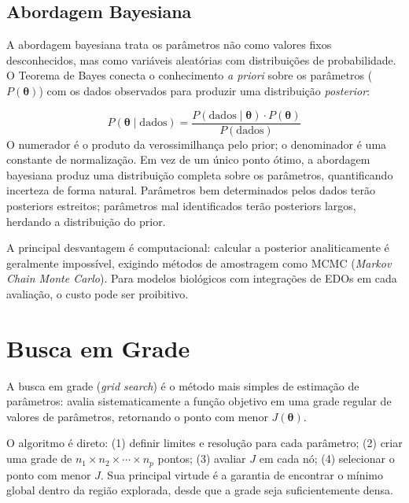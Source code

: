 \subsection{Abordagem Bayesiana}

A abordagem bayesiana trata os parâmetros não como valores fixos desconhecidos, mas como
variáveis aleatórias com distribuições de probabilidade. O Teorema de Bayes conecta o
conhecimento \emph{a priori} sobre os parâmetros ($P(\boldsymbol{\theta})$) com os dados
observados para produzir uma distribuição \emph{posterior}:

\begin{equation}
P(\boldsymbol{\theta} \mid \text{dados}) = \frac{P(\text{dados} \mid \boldsymbol{\theta}) \cdot P(\boldsymbol{\theta})}{P(\text{dados})}
\end{equation}
O numerador é o produto da verossimilhança pelo prior; o denominador é uma constante de
normalização. Em vez de um único ponto ótimo, a abordagem bayesiana produz uma distribuição
completa sobre os parâmetros, quantificando incerteza de forma natural. Parâmetros bem
determinados pelos dados terão posteriors estreitos; parâmetros mal identificados terão
posteriors largos, herdando a distribuição do prior.

A principal desvantagem é computacional: calcular a posterior analiticamente é geralmente
impossível, exigindo métodos de amostragem como MCMC (\textit{Markov Chain Monte Carlo}).
Para modelos biológicos com integrações de EDOs em cada avaliação, o custo pode ser
proibitivo.


\section{Busca em Grade}

\begin{definicaoenv}
A busca em grade (\textit{grid search}) é o método mais simples de estimação de parâmetros:
avalia sistematicamente a função objetivo em uma grade regular de valores de parâmetros,
retornando o ponto com menor $J(\boldsymbol{\theta})$.
\end{definicaoenv}

O algoritmo é direto: (1) definir limites e resolução para cada parâmetro; (2) criar uma
grade de $n_1 \times n_2 \times \cdots \times n_p$ pontos; (3) avaliar $J$ em cada nó;
(4) selecionar o ponto com menor $J$. Sua principal virtude é a garantia de encontrar o
mínimo global dentro da região explorada, desde que a grade seja suficientemente densa.

